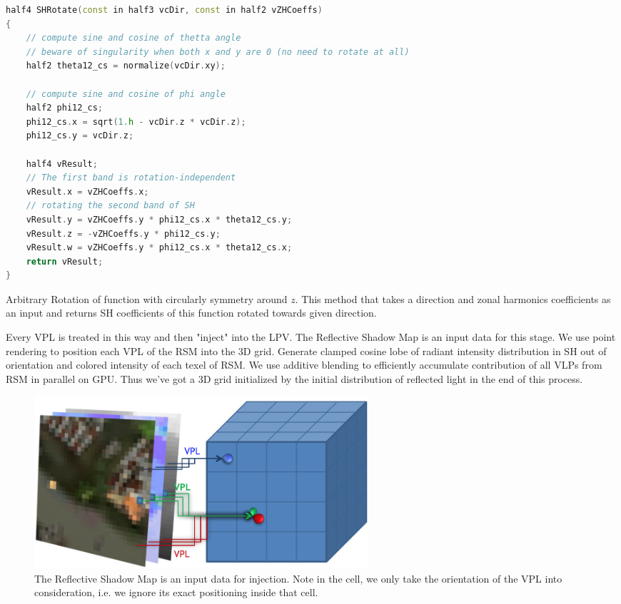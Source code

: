 \begin{algorithm}\label{al:spherical-harmonics-projections}
\begin{lstlisting}[language=C++]
half4 SHRotate(const in half3 vcDir, const in half2 vZHCoeffs)
{
	// compute sine and cosine of thetta angle
	// beware of singularity when both x and y are 0 (no need to rotate at all) 
	half2 theta12_cs = normalize(vcDir.xy);
 	
	// compute sine and cosine of phi angle
	half2 phi12_cs;
	phi12_cs.x = sqrt(1.h - vcDir.z * vcDir.z); 
	phi12_cs.y = vcDir.z;
	
	half4 vResult;
	// The first band is rotation-independent
	vResult.x = vZHCoeffs.x;
	// rotating the second band of SH
	vResult.y = vZHCoeffs.y * phi12_cs.x * theta12_cs.y; 
	vResult.z = -vZHCoeffs.y * phi12_cs.y;
	vResult.w = vZHCoeffs.y * phi12_cs.x * theta12_cs.x;
	return vResult;
}                                                                              
\end{lstlisting}	
\caption{Arbitrary Rotation of function with circularly symmetry around $z$. This method that takes a direction and zonal harmonics coefficients as an input and returns SH coefficients of this function rotated towards given direction.}
\end{algorithm}

Every VPL is treated in this way and then "inject" into the LPV. The Reflective Shadow Map is an input data for this stage. We use point rendering to position each VPL of the RSM into the 3D grid. Generate clamped cosine lobe of radiant intensity distribution in SH out of orientation and colored intensity of each texel of RSM. We use additive blending to efficiently accumulate contribution of all VLPs from RSM in parallel on GPU. Thus we've got a 3D grid initialized by the initial distribution of reflected light in the end of this process.

\begin{figure}
\begin{center}
	\includegraphics[width=0.6\textwidth]{graphics/lpv/lpv-4}
\end{center}
\caption{The Reflective Shadow Map is an input data for injection. Note in the cell, we only take the orientation of the VPL into consideration, i.e. we ignore its exact positioning inside that cell.}
\end{figure}




